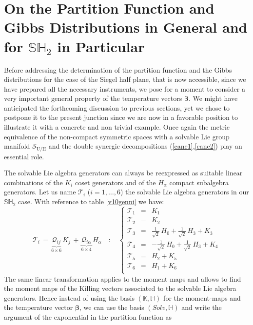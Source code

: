 \documentclass[10pt,a4paper]{article}
\begin{document}
\section{On the Partition Function and Gibbs Distributions in General and for $\mathbb{SH}_2$ in Particular}
\label{ciurlacco}
Before addressing the determination of the partition function and the Gibbs distributions for the case of the Siegel half plane, that is now accessible, since we have prepared all the necessary instruments, we pose for a moment to consider a very important general property of the temperature vectors $\boldsymbol{\beta}$. We might have anticipated the forthcoming discussion to previous sections, yet we chose to postpone it to the present junction since we are now in a favorable position to illustrate it with a concrete and non trivial example. Once again the
metric equivalence of the non-compact symmetric spaces with a solvable Lie group manifold $\mathcal{S}_{\mathrm{U/H}}$ and the double synergic decompositions (\ref{cane1},\ref{cane2}) play an essential role.
\par
The solvable Lie algebra generators can always be reexpressed as suitable linear combinations of the $K_i$ coset generators and of the $H_\alpha$ compact subalgebra generators. Let us name $\mathcal{T}_i$ ($i=1,\dots,6$) the solvable Lie algebra generators in our $\mathbb{SH}_2$ case. With reference to table \ref{v10genni} we have:
\begin{equation}\label{orosubile}
 \mathcal{T}_i \, = \, \underbrace{\mathcal{Q}_{ij}}_{6\times 6} \, K_j \, + \,\underbrace{ \mathcal{Q}_{i\alpha}}_{6\times 4} \, H_\alpha
 \quad : \quad \left\{\begin{array}{rcl}
 \mathcal{T}_1 & = & K_1 \\
 \mathcal{T}_2 & = & K_2 \\
 \mathcal{T}_3 & = & \frac{1}{\sqrt{2}}\,H_0+\frac{1}{\sqrt{2}}\, H_3+K_3 \\
 \mathcal{T}_4 & = & -\frac{1}{\sqrt{2}}\,H_0+\frac{1}{\sqrt{2}}\, H_3+K_4
   \\
 \mathcal{T}_5 & = & H_2+K_5 \\
 \mathcal{T}_6 & = & H_1+K_6 \\
\end{array} \right.
\end{equation}
The same linear transformation applies to the moment maps and allows to find the moment maps of the Killing vectors associated to the solvable Lie algebra generators. Hence instead of using the basis $(\mathbb{K},\mathbb{H})$ for the moment-maps and the temperature vector $\boldsymbol{\beta}$, we can use the basis $(Solv,\mathbb{H})$ and write the argument of the exponential in the partition function as
\end{document}
